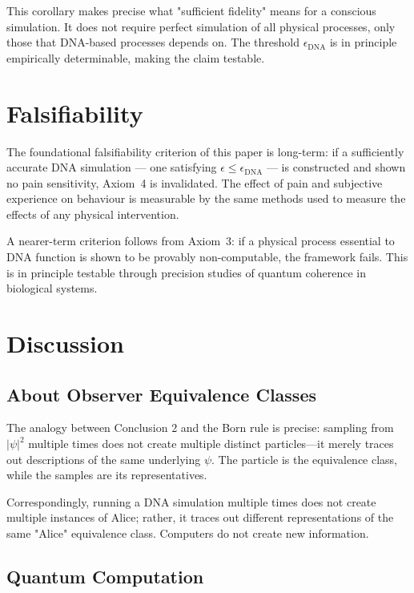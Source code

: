 \documentclass[11pt]{article}
\begin{document}
This corollary makes precise what "sufficient fidelity" means for a
conscious simulation. It does not require perfect simulation of all physical
processes, only those that DNA-based processes depends on. The
threshold $\epsilon_{\mathrm{DNA}}$ is in principle empirically determinable,
making the claim testable.

\section{Falsifiability}
\label{sec:falsifiability}

The foundational falsifiability criterion of this paper is long-term: if a
sufficiently accurate DNA simulation --- one satisfying
$\epsilon \leq \epsilon_{\mathrm{DNA}}$ --- is constructed and shown
no pain sensitivity, Axiom~4 is invalidated. The effect of pain
and subjective experience on behaviour is measurable by the same methods
used to measure the effects of any physical intervention. 

A nearer-term criterion follows from Axiom~3: if a physical process
essential to DNA function is shown to be provably non-computable, the
framework fails. This is in principle testable through precision studies
of quantum coherence in biological systems.

\section{Discussion}
\label{sec:discussion}


\subsection*{About Observer Equivalence Classes}

The analogy between Conclusion 2 and the Born rule is precise: sampling from $|\psi|^2$ 
multiple times does not create multiple distinct particles—it merely traces out descriptions 
of the same underlying $\psi$. The particle is the equivalence class, while the samples 
are its representatives.

Correspondingly, running a DNA simulation multiple times does not create multiple 
instances of Alice; rather, it traces out different representations of the same "Alice" 
equivalence class. Computers do not create new information.


\subsection{Quantum Computation}
\end{document}
